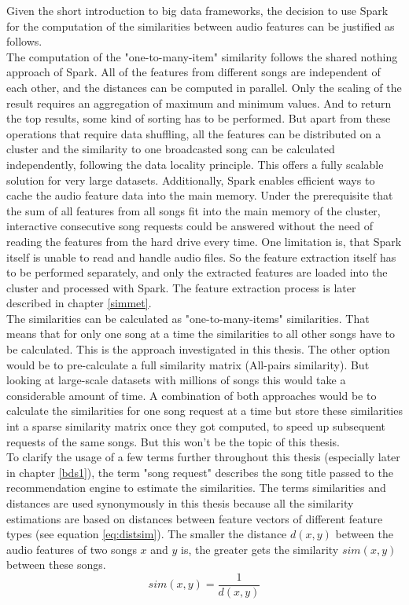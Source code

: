 Given the short introduction to big data frameworks, the decision to use Spark for the computation of the similarities between audio features can be justified as follows.\\
The computation of the "one-to-many-item" similarity follows the shared nothing approach of Spark. All of the features from different songs are independent of each other, and the distances can be computed in parallel. Only the scaling of the result requires an aggregation of maximum and minimum values. And to return the top results, some kind of sorting has to be performed. But apart from these operations that require data shuffling, all the features can be distributed on a cluster and the similarity to one broadcasted song can be calculated independently, following the data locality principle. This offers a fully scalable solution for very large datasets. Additionally, Spark enables efficient ways to cache the audio feature data into the main memory. Under the prerequisite that the sum of all features from all songs fit into the main memory of the cluster, interactive consecutive song requests could be answered without the need of reading the features from the hard drive every time.
One limitation is, that Spark itself is unable to read and handle audio files. So the feature extraction itself has to be performed separately, and only the extracted features are loaded into the cluster and processed with Spark. The feature extraction process is later described in chapter \ref{simmet}.\\
The similarities can be calculated as "one-to-many-items" similarities. That means that for only one song at a time the similarities to all other songs have to be calculated. This is the approach investigated in this thesis. The other option would be to pre-calculate a full similarity matrix (All-pairs similarity). But looking at large-scale datasets with millions of songs this would take a considerable amount of time. A combination of both approaches would be to calculate the similarities for one song request at a time but store these similarities int a sparse similarity matrix once they got computed, to speed up subsequent requests of the same songs. But this won't be the topic of this thesis.\\ 
To clarify the usage of a few terms further throughout this thesis (especially later in chapter \ref{bds1}), the term "song request" describes the song title passed to the recommendation engine to estimate the similarities. The terms similarities and distances are used synonymously in this thesis because all the similarity estimations are based on distances between feature vectors of different feature types (see equation \ref{eq:distsim}). The smaller the distance $d(x, y)$ between the audio features of two songs $x$ and $y$ is, the greater gets the similarity $sim(x, y)$ between these songs.\\
\begin{equation} \label{eq:distsim}
sim(x, y) = \frac{1}{d(x, y)}
\end{equation}

